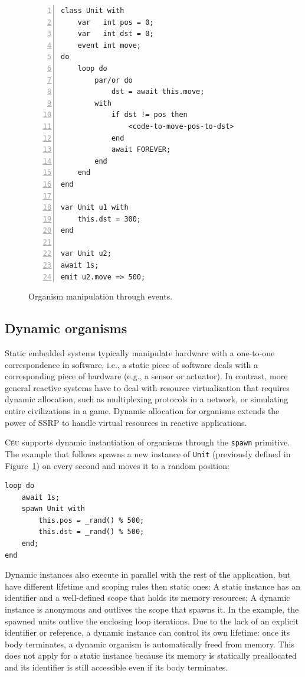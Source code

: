 \documentclass[preprint]{sigplanconf}
\newcommand{\CEU}{\textsc{C\'{e}u}\xspace}
\newcommand{\code}[1] {{\small{\texttt{#1}}}}
\newcommand{\1}{\;}
\newcommand{\2}{\;\;}
\newcommand{\3}{\;\;\;}
\newcommand{\5}{\;\;\;\;\;}
\begin{document}
\begin{figure}%
\begin{lstlisting}[numbers=left,xleftmargin=3em]
class Unit with
    var   int pos = 0;
    var   int dst = 0;
    event int move;
do
    loop do
        par/or do
            dst = await this.move;
        with
            if dst != pos then
                <code-to-move-pos-to-dst>
            end
            await FOREVER;
        end
    end
end

var Unit u1 with
    this.dst = 300;
end

var Unit u2;
await 1s;
emit u2.move => 500;
\end{lstlisting}
\caption{ Organism manipulation through events.
\label{lst.unit}
}
\end{figure}

\subsection{Dynamic organisms}
\label{sec.orgs.dyn}

Static embedded systems typically manipulate hardware with a one-to-one 
correspondence in software, i.e., a static piece of software deals with a 
corresponding piece of hardware (e.g., a sensor or actuator).
%
In contrast, more general reactive systems have to deal with resource 
virtualization that requires dynamic allocation, such as multiplexing protocols 
in a network, or simulating entire civilizations in a game.
%
Dynamic allocation for organisms extends the power of SSRP to handle virtual 
resources in reactive applications.

\CEU supports dynamic instantiation of organisms through the \code{spawn} 
primitive.
The example that follows spawns a new instance of \code{Unit} (previously 
defined in Figure~\ref{lst.unit}) on every second and moves it to a random 
position:

\begin{lstlisting}
loop do
    await 1s;
    spawn Unit with
        this.pos = _rand() % 500;
        this.dst = _rand() % 500;
    end;
end
\end{lstlisting}


Dynamic instances also execute in parallel with the rest of the application, 
but have different lifetime and scoping rules then static ones:
%
A static instance has an identifier and a well-defined scope that holds its 
memory resources;
A dynamic instance is anonymous and outlives the scope that spawns it.
In the example, the spawned units outlive the enclosing loop iterations.
%
Due to the lack of an explicit identifier or reference, a dynamic instance can 
control its own lifetime:
once its body terminates, a dynamic organism is automatically freed from 
memory.
%
This does not apply for a static instance because its memory is statically 
preallocated and its identifier is still accessible even if its body 
terminates.
\end{document}
